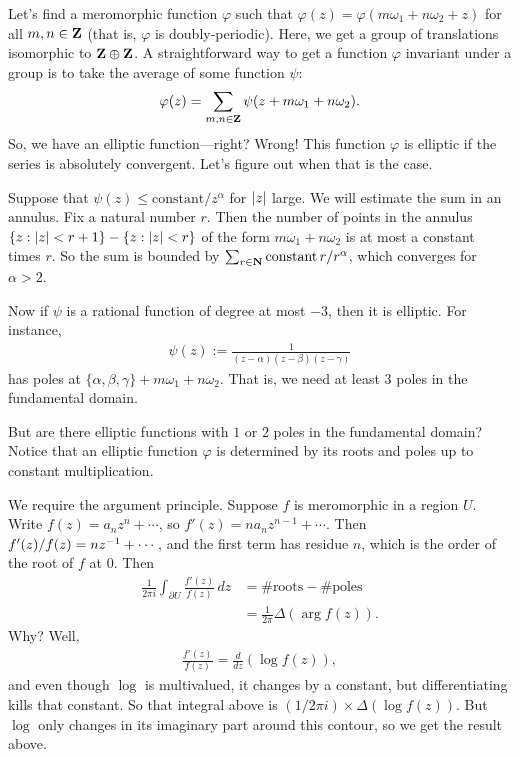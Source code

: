 \documentclass[11pt, oneside,margin=1in]{article}
\begin{document}
Let's find a meromorphic function $\varphi$ such that $\varphi(z) = \varphi (m\omega_1 + n\omega_2 + z)$ for all $m,n\in\mathbf Z$ (that is, $\varphi$ is doubly-periodic). Here, we get a group of translations isomorphic to $\mathbf Z\oplus\mathbf Z$. A straightforward way to get a function $\varphi$ invariant under a group is to take the average of some function $\psi$:  
 \begin{align*}
	\varphi(z) = \sum_{m,n\in \mathbf Z} \psi (z+m\omega_1 + n\omega_2).
\end{align*}
So, we have an elliptic function---right? Wrong! This function $\varphi$ is elliptic if the series is absolutely convergent. Let's figure out when that is the case.

Suppose that $\psi(z)\le \textrm{constant}/z^\alpha$ for $\left \lvert z \right \rvert$ large. We will estimate the sum in an annulus. Fix a natural number $r$. Then the number of points in the annulus $\{z : \left \lvert z \right \rvert < r+1\} - \{z : \left \lvert z \right \rvert < r\}$ of the form $m\omega_1 + n\omega_2$ is at most a constant times $r$. So the sum is bounded by $\sum _{r\in \mathbf N} \textrm{constant}\, r/r^\alpha$, which converges for $\alpha>2$.

Now if $\psi$ is a rational function of degree at most $-3$, then it is elliptic. For instance,
\begin{align*}
	\psi(z) := \frac{1}{ (z-\alpha) (z-\beta) (z-\gamma)}
\end{align*}
has poles at $\{\alpha,\beta,\gamma\}+m\omega_1 + n\omega_2$. That is, we need at least $3$ poles in the fundamental domain. 

But are there elliptic functions with $1$ or $2$ poles in the fundamental domain? Notice that an elliptic function $\varphi$ is determined by its roots and poles up to constant multiplication. 

We require the argument principle. Suppose $f$ is meromorphic in a region $U$. Write $f(z) = a_nz^n+\cdots$, so $f'(z) = na_nz^{n-1} + \cdots$. Then $f'(z)/f (z) = nz^{-1} + \cdots$, and the first term has residue $n$, which is the order of the root of $f$ at $0$. Then 
\begin{align*}
\frac{1}{2\pi i} \int_{\partial U} \frac{f'(z)}{f (z)} \, dz &= \# \textrm{roots} - \#\textrm{poles} \\
							     &= \frac{1}{2\pi}\Delta (\arg f(z)).
\end{align*}
Why? Well, 
\begin{align*}
	\frac{f'(z)}{f (z)} = \frac{d}{dz} (\log  f(z)),
\end{align*}
and even though $\log$ is multivalued, it changes by a constant, but differentiating kills that constant. So that integral above is $(1/2\pi i)\times \Delta  (\log f(z))$. But $\log$ only changes in its imaginary part around this contour, so we get the result above.
\end{document}
